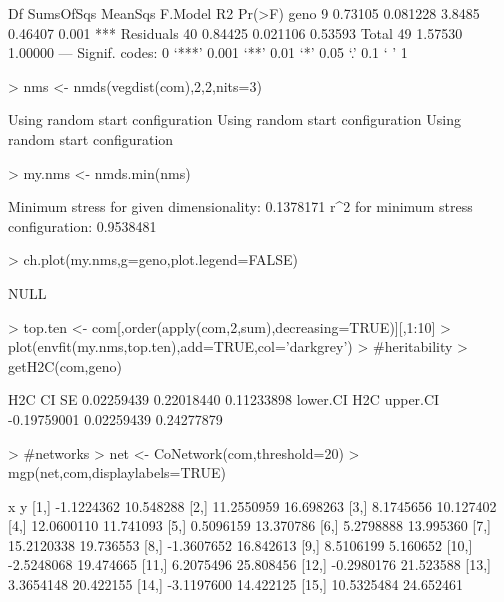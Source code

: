 \documentclass[12pt]{article}
\begin{document}
\begin{Schunk}
\begin{Soutput}
          Df SumsOfSqs  MeanSqs F.Model      R2 Pr(>F)    
geno       9   0.73105 0.081228  3.8485 0.46407  0.001 ***
Residuals 40   0.84425 0.021106         0.53593           
Total     49   1.57530                  1.00000           
---
Signif. codes:  0 ‘***’ 0.001 ‘**’ 0.01 ‘*’ 0.05 ‘.’ 0.1 ‘ ’ 1
\end{Soutput}
\begin{Sinput}
> nms <- nmds(vegdist(com),2,2,nits=3)
\end{Sinput}
\begin{Soutput}
Using random start configuration 
Using random start configuration 
Using random start configuration 
\end{Soutput}
\begin{Sinput}
> my.nms <- nmds.min(nms)
\end{Sinput}
\begin{Soutput}
Minimum stress for given dimensionality:  0.1378171 
r^2 for minimum stress configuration:  0.9538481 
\end{Soutput}
\begin{Sinput}
> ch.plot(my.nms,g=geno,plot.legend=FALSE)
\end{Sinput}
\begin{Soutput}
NULL
\end{Soutput}
\begin{Sinput}
> top.ten <- com[,order(apply(com,2,sum),decreasing=TRUE)][,1:10]
> plot(envfit(my.nms,top.ten),add=TRUE,col='darkgrey')
>                                         #heritability
> getH2C(com,geno)
\end{Sinput}
\begin{Soutput}
       H2C         CI         SE 
0.02259439 0.22018440 0.11233898 
   lower.CI         H2C    upper.CI 
-0.19759001  0.02259439  0.24277879 
\end{Soutput}
\begin{Sinput}
>                                         #networks
> net <- CoNetwork(com,threshold=20)
> mgp(net,com,displaylabels=TRUE)
\end{Sinput}
\begin{Soutput}
               x         y
 [1,] -1.1224362 10.548288
 [2,] 11.2550959 16.698263
 [3,]  8.1745656 10.127402
 [4,] 12.0600110 11.741093
 [5,]  0.5096159 13.370786
 [6,]  5.2798888 13.995360
 [7,] 15.2120338 19.736553
 [8,] -1.3607652 16.842613
 [9,]  8.5106199  5.160652
[10,] -2.5248068 19.474665
[11,]  6.2075496 25.808456
[12,] -0.2980176 21.523588
[13,]  3.3654148 20.422155
[14,] -3.1197600 14.422125
[15,] 10.5325484 24.652461

\end{Soutput}
\end{Schunk}
\end{document}
